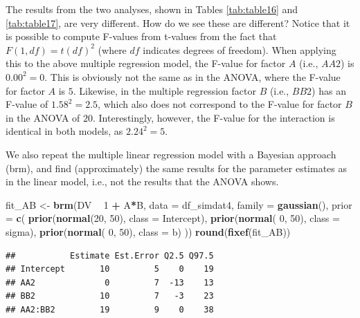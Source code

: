 \documentclass[12pt,]{krantz}
\newenvironment{Shaded}{\begin{snugshade}}{\end{snugshade}}
\newcommand{\KeywordTok}[1]{\textcolor[rgb]{0.13,0.29,0.53}{\textbf{#1}}}
\newcommand{\DataTypeTok}[1]{\textcolor[rgb]{0.13,0.29,0.53}{#1}}
\newcommand{\DecValTok}[1]{\textcolor[rgb]{0.00,0.00,0.81}{#1}}
\newcommand{\StringTok}[1]{\textcolor[rgb]{0.31,0.60,0.02}{#1}}
\newcommand{\OperatorTok}[1]{\textcolor[rgb]{0.81,0.36,0.00}{\textbf{#1}}}
\newcommand{\NormalTok}[1]{#1}
\theoremstyle{definition}
\theoremstyle{definition}
\theoremstyle{definition}
\theoremstyle{remark}
\begin{document}
The results from the two analyses, shown in Tables \ref{tab:table16} and
\ref{tab:table17}, are very different. How do we see these are
different? Notice that it is possible to compute F-values from t-values
from the fact that \(F(1,df) = t(df)^2\) \citep{snedecor1967statistical}
(where \(df\) indicates degrees of freedom). When applying this to the
above multiple regression model, the F-value for factor \(A\) (i.e.,
\(AA2\)) is \(0.00^2 = 0\). This is obviously not the same as in the
ANOVA, where the F-value for factor \(A\) is \(5\). Likewise, in the
multiple regression factor \(B\) (i.e., \(BB2\)) has an F-value of
\(1.58^2 = 2.5\), which also does not correspond to the F-value for
factor \(B\) in the ANOVA of \(20\). Interestingly, however, the F-value
for the interaction is identical in both models, as \(2.24^2 = 5\).

We also repeat the multiple linear regression model with a Bayesian
approach (brm), and find (approximately) the same results for the
parameter estimates as in the linear model, i.e., not the results that
the ANOVA shows.

\begin{Shaded}
\begin{Highlighting}[]
\NormalTok{fit_AB <-}\StringTok{ }\KeywordTok{brm}\NormalTok{(DV }\OperatorTok{~}\StringTok{ }\DecValTok{1} \OperatorTok{+}\StringTok{ }\NormalTok{A}\OperatorTok{*}\NormalTok{B,}
                 \DataTypeTok{data =}\NormalTok{ df_simdat4,}
                 \DataTypeTok{family =} \KeywordTok{gaussian}\NormalTok{(),}
                 \DataTypeTok{prior =} \KeywordTok{c}\NormalTok{(}
                     \KeywordTok{prior}\NormalTok{(}\KeywordTok{normal}\NormalTok{(}\DecValTok{20}\NormalTok{, }\DecValTok{50}\NormalTok{), }\DataTypeTok{class =}\NormalTok{ Intercept),}
                     \KeywordTok{prior}\NormalTok{(}\KeywordTok{normal}\NormalTok{( }\DecValTok{0}\NormalTok{, }\DecValTok{50}\NormalTok{), }\DataTypeTok{class =}\NormalTok{ sigma),}
                     \KeywordTok{prior}\NormalTok{(}\KeywordTok{normal}\NormalTok{( }\DecValTok{0}\NormalTok{, }\DecValTok{50}\NormalTok{), }\DataTypeTok{class =}\NormalTok{ b)}
\NormalTok{                 )) }
\KeywordTok{round}\NormalTok{(}\KeywordTok{fixef}\NormalTok{(fit_AB))}
\end{Highlighting}
\end{Shaded}

\begin{verbatim}
##           Estimate Est.Error Q2.5 Q97.5
## Intercept       10         5    0    19
## AA2              0         7  -13    13
## BB2             10         7   -3    23
## AA2:BB2         19         9    0    38
\end{verbatim}
\end{document}
